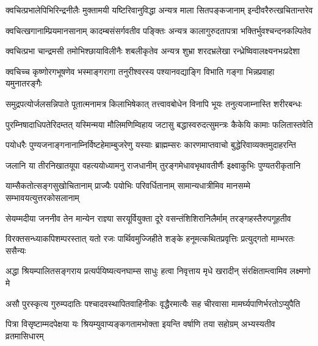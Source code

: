 \fourlineindentedshloka
{क्वचित्प्रभालेपिभिरिन्द्रनीलैः}
{मुक्तामयी यष्टिरिवानुविद्धा}
{अन्यत्र माला सितपङ्कजानाम्}
{इन्दीवरैरुत्खचितान्तरेव} %

\fourlineindentedshloka
{क्वचित्खगानाम्प्रियमानसानाम्}
{कादम्बसंसर्गवतीव पङ्क्तिः}
{अन्यत्र कालागुरुदतापत्रा}
{भक्तिर्भुवश्चन्दनकल्पितेव} %

\fourlineindentedshloka
{क्वचित्प्रभा चान्द्रमसी}
{तमोभिश्छायाविलीनैः शबलीकृतेव}
{अन्यत्र शुभ्रा शरदभ्रलेखा}
{रन्ध्रेष्विवालक्ष्यनभःप्रदेशा} %

\fourlineindentedshloka
{क्वचिच्च कृष्णोरगभूषणेव}
{भस्माङ्गरागा तनुरीश्वरस्य}
{पश्यानवद्याङ्गि विभाति गङ्गा}
{भिन्नप्रवाहा यमुनातरङ्गैः} %

\fourlineindentedshloka
{समुद्रपत्योर्जलसन्निपाते}
{पूतात्मनामत्र किलाभिषेकात्}
{तत्त्वावबोधेन विनापि भूयः}
{तनुत्यजाम्नास्ति शरीरबन्धः} %

\fourlineindentedshloka
{पुरम्निषादाधिपतेरिदम्तत्}
{यस्मिन्मया मौलिमणिम्विहाय}
{जटासु बद्धास्वरुदत्सुमन्त्रः}
{कैकेयि कामाः फलितास्तवेति} %

\twolineshloka
{पयोधरैः पुण्यजनाङ्गनानाम्निर्विष्टहेमाम्बुजरेणु यस्याः}
{ब्राह्मम्सरः कारणमाप्तवाचो बुद्धेरिवाव्यक्तमुदाहरन्ति} %

\fourlineindentedshloka
{जलानि या तीरनिखातयूपा}
{वहत्ययोध्यामनु राजधानीम्}
{तुरङ्गमेधावभृथावतीर्णैः}
{इक्ष्वाकुभिः पुण्यतरीकृतानि} %

\fourlineindentedshloka
{याम्सैकतोत्सङ्गसुखोचितानाम्}
{प्राज्यैः पयोभिः परिवर्धितानाम्}
{सामान्यधात्रीमिव मानसम्मे}
{सम्भावयत्युत्तरकोसलानाम्} %

\fourlineindentedshloka
{सेयम्मदीया जननीव तेन}
{मान्येन राज्ञ्या सरयूर्वियुक्ता}
{दूरे वसन्तंशिशिरानिलैर्माम्}
{तरङ्गहस्तैरुपगूहतीव} %

\fourlineindentedshloka
{विरक्तसन्ध्याकपिशम्परस्तात्}
{यतो रजः पार्थिवमुज्जिहीते}
{शङ्के हनूमत्कथितप्रवृत्तिः}
{प्रत्युद्गतो माम्भरतः ससैन्यः} %

\fourlineindentedshloka
{अद्धा श्रियम्पालितसङ्गराय}
{प्रत्यर्पयिष्यत्यनघाम्स साधुः}
{हत्वा निवृत्ताय मृधे खरादीन्}
{संरक्षिताम्त्वामिव लक्ष्मणो मे} %

\fourlineindentedshloka
{असौ पुरस्कृत्य गुरुम्पदातिः}
{पश्चादवस्थापितवाहिनीकः}
{वृद्धैरमात्यैः सह चीरवासा}
{मामर्घ्यपाणिर्भरतोऽप्युपैति} %

\fourlineindentedshloka
{पित्रा विसृष्टाम्मदपेक्षया यः}
{श्रियम्युवाप्यङ्कगतामभोक्ता}
{इयन्ति वर्षाणि तया सहोग्रम्}
{अभ्यस्यतीव व्रतमासिधारम्} %

